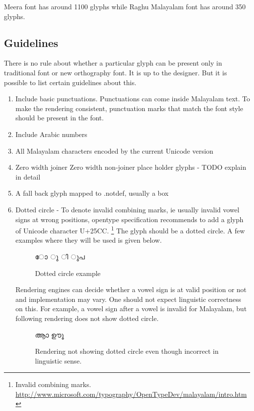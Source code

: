 Meera font has around 1100 glyphs while Raghu Malayalam font has around 350
glyphs.

\subsection{Guidelines}

There is no rule about whether a particular glyph can be present only in
traditional font or new orthography font. It is up to the designer. But it is
possible to list certain guidelines about this.

\begin{enumerate}
\item Include basic punctuations. Punctuations can come inside Malayalam text.
To make the rendering consistent, punctuation marks that match the font style
should be present in the font.
\item Include Arabic numbers
\item All Malayalam characters encoded by the current Unicode version
\item Zero width joiner Zero width non-joiner place holder glyphs - TODO
explain in detail
\item A fall back glyph mapped to .notdef, usually a box
\item Dotted circle - To denote invalid combining marks, ie usually invalid
vowel signs at wrong positions, opentype specification
recommends to add a glyph of Unicode character U+25CC.
\footnote{Invalid combining marks.
\url{http://www.microsoft.com/typography/OpenTypeDev/malayalam/intro.htm}}
The glyph should be a
dotted circle. A few examples where they will be used is given below.
\begin{figure}[h]
  \centering
  {\meera\textexample ോ ു ി ുപ }\\
  \caption{Dotted circle example}
\end{figure}

Rendering engines can decide whether a vowel sign is at valid position or not
and implementation may vary.
One should not expect linguistic correctness on this. For example, a vowel sign
after a vowel is invalid for Malayalam, but following rendering does not show
dotted circle.

\begin{figure}[h]
  \centering
  {\meera\textexample ആാ ഊൂ }\\
  \caption{Rendering not showing dotted circle even though incorrect in
linguistic sense.}
\end{figure}


\end{enumerate}

